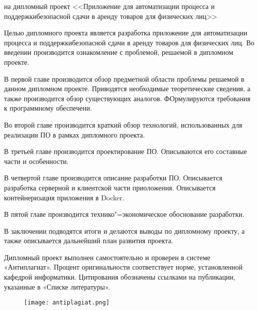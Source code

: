 \thispagestyle{empty}

\begin{center}
  \begin{minipage}{0.82\textwidth}
    на дипломный проект <<Приложение для автоматизации процесса и поддержкибезопасной сдачи в аренду товаров для физических лиц>>
  \end{minipage}
\end{center}

Целью дипломного проекта является разработка приложение для автоматизации процесса и поддержкибезопасной сдачи в аренду товаров для физических лиц.
Во введении производится ознакомление с проблемой, решаемой в дипломном проекте.

В первой главе производится обзор предметной области проблемы решаемой в данном дипломном проекте.
Приводятся необходимые теоретические сведения, а также производится обзор существующих аналогов.
ФОрмулируются требования к программному обеспечени.

Во второй главе производится краткий обзор технологий, использованных для реализации ПО в рамках дипломного проекта.

В третьей главе производится проектирование ПО.
Описываются его составные части и особенности.

В четвертой главе производится описание разработки ПО.
Описывается разработка серверной и клиентской части приоложения.
Описывается контейнеризация приложения в Docker.

В пятой главе производится технико"=экономическое обоснование разработки.

В заключении подводятся итоги и делаются выводы по дипломному проекту, а также описывается дальнейший план развития проекта.

Дипломный проект выполнен самостоятельно и проверен в системе «Антиплагиат».
Процент оригинальности соответствует норме, установленной кафедрой информатики.
Цитирования обозначены ссылками на публикации, указанные в «Списке литературы».

\begin{figure}[h]
  \centering
  \texttt{[image: antiplagiat.png]}
\end{figure}

\clearpage
